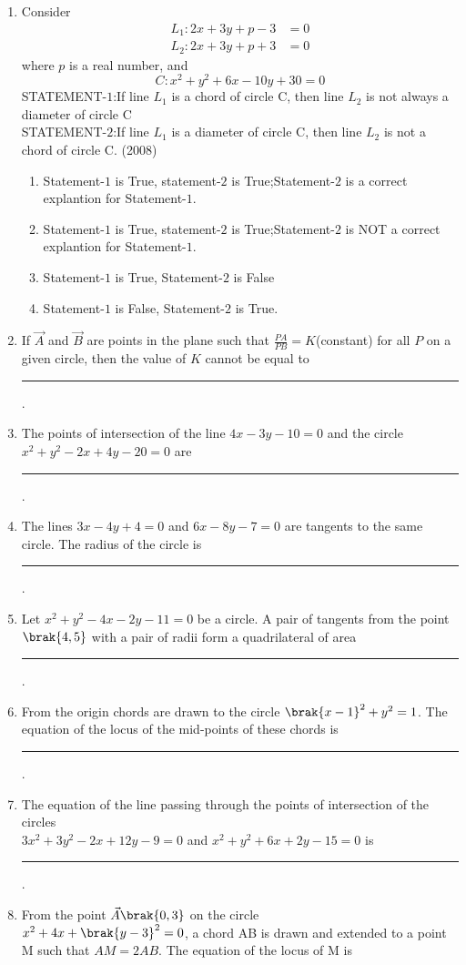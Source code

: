 \begin{enumerate}
\item Consider 
\begin{align*}
	L_1:2x+3y+p-3&=0
	\\
               L_2:2x+3y+p+3&=0
\end{align*}
where $p$ is a real number, and 
		$$	C: x^2+y^2+6x-10y+30=0$$
STATEMENT-$1$:If line $L_1$ is a chord of circle C, then line $L_2$ is not always a diameter of circle C\\
STATEMENT-$2$:If line $L_1$ is a diameter of circle C, then line $L_2$ is not a chord  of circle C. \hfill(2008)
\begin{enumerate}
\item Statement-$1$ is True, statement-$2$ is True;Statement-$2$ is a correct explantion for Statement-$1$.
\item Statement-$1$ is True, statement-$2$ is True;Statement-$2$ is NOT a correct explantion for Statement-$1$.
\item Statement-$1$ is True, Statement-$2$ is False
\item Statement-$1$ is False, Statement-$2$ is True.	
\end{enumerate}
	\item If $\vec{A}$ and $\vec{B}$ are points in the plane such that  $\frac{PA}{PB}=K$(constant) for all $P$ on a given circle,  then the value of $K$ cannot be equal to \rule{1cm}{0.01pt}.
		\hfill{}
\item The points of intersection of the line $4x-3y-10=0$ and the circle $x^{2}+y^{2}-2x+4y-20=0$ are    \rule{1cm}{0.01pt}.
	\hfill{}
\item The lines $3x-4y+4=0$ and $6x-8y-7=0$ are tangents to the same circle. The radius of the circle is \rule{1cm}{0.01pt}.
	\hfill{}
\item Let $x^{2}+y^{2}-4x-2y-11=0$ be a circle. A pair of tangents from the point $\brak{4, 5}$ with a pair of radii form a quadrilateral of area
\rule{1cm}{0.01pt}.
%
	\hfill{}
\item From the origin chords are drawn  to the circle $\brak{x-1}^{2}+y^{2}=1$. The equation of the locus of the mid-points of these chords is
\rule{1cm}{0.01pt}.
	\hfill{}
\item The equation of the line passing through the points of intersection of the circles\\ $3x^{2}+3y^{2}-2x+12y-9=0$ and $x^{2}+y^{2}+6x+2y-15=0$ is
\rule{1cm}{0.01pt}.
	\hfill{}
\item From the point $\vec{A}\brak{0, 3}$ on the circle \\            $x^{2}+4x+\brak{y-3}^{2}=0$,  a chord AB is drawn and extended to a point M such that $AM=2AB$. The equation of the locus of M is 

\end{enumerate}
